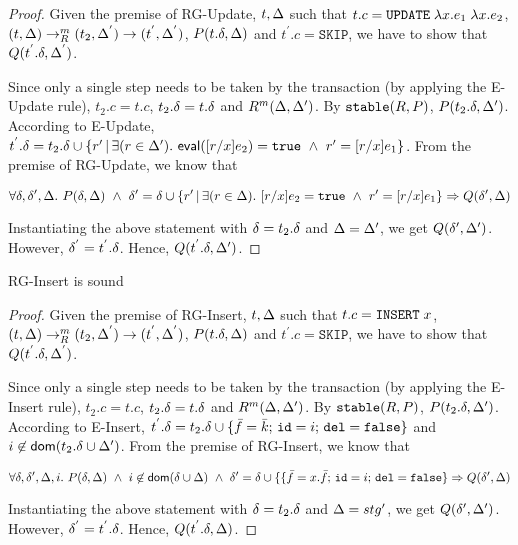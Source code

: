 \documentclass[acmlarge,anonymous]{acmart}\settopmatter{printfolios=true}
\begin{document}
\begin{proof}
Given the premise of RG-Update, $t, \Delta$ such that $t.c = \texttt{UPDATE}\;\lambda x.e_1\;\lambda x.e_2$, $(t, \Delta) \rightarrow_{R}^{m} (t_2, \Delta^{'}) \rightarrow (t^{'}, \Delta^{'})$, $P(t.\delta, \Delta)$ and $t^{'}.c = \texttt{SKIP}$, we have to show that $Q(t^{'}.\delta, \Delta^{'})$. 

Since only a single step needs to be taken by the transaction (by applying the E-Update rule), $t_2.c = t.c$, $t_2.\delta = t.\delta$ and $R^m(\Delta, \Delta')$. By $\mathtt{stable}(R, P)$, $P(t_2.\delta, \Delta')$. According to E-Update,  $t^{'}.\delta = t_2.\delta \cup \{r' \,|\, \exists(r\in \Delta').~ \textsf{eval}([r/x]e_2)={\tt true} ~\wedge~ r'=[r/x]e_1\}$. From the premise of RG-Update, we know that 

$$
\forall\delta,\delta',\Delta.~P(\delta,\Delta) ~\wedge~ 
  \delta' = \delta \cup \{r' \,|\, \exists(r \in \Delta).~ [r/x]e_2 ={\tt true} ~\wedge~ r'=[r/x]e_1\} \Rightarrow 
  Q(\delta',\Delta)
$$

Instantiating the above statement with $\delta = t_2.\delta$ and $\Delta = \Delta'$, we get $Q(\delta',\Delta')$. However, $\delta^{'} = t^{'}.\delta$. Hence, $Q(t^{'}.\delta,\Delta')$.
\end{proof}

\begin{theorem}
RG-Insert is sound
\end{theorem}

\begin{proof}
Given the premise of RG-Insert, $t, \Delta$ such that $t.c = \texttt{INSERT}\;x$, $(t, \Delta) \rightarrow_{R}^{m} (t_2, \Delta^{'}) \rightarrow (t^{'}, \Delta^{'})$, $P(t.\delta, \Delta)$ and $t^{'}.c = \texttt{SKIP}$, we have to show that $Q(t^{'}.\delta, \Delta^{'})$. 

Since only a single step needs to be taken by the transaction (by applying the E-Insert rule), $t_2.c = t.c$, $t_2.\delta = t.\delta$ and $R^m(\Delta, \Delta')$. By $\mathtt{stable}(R, P)$, $P(t_2.\delta, \Delta')$. According to E-Insert, $t^{'}.\delta = t_2.\delta \cup \{\bar{f}=\bar{k};\,\texttt{id}=i;\,\texttt{del}={\tt false}\}$ and $i \not\in \textsf{dom}(t_2.\delta \cup \Delta')$. From the premise of RG-Insert, we know that 

$$
\forall\delta,\delta',\Delta,i.~P(\delta,\Delta) ~\wedge~ i \not\in
  \textsf{dom}(\delta\cup\Delta) 
  ~\wedge~ \delta'=\delta \cup 
  \{\{\bar{f}=x.\bar{f};\,\texttt{id}=i;\,\texttt{del}={\tt false}\} \Rightarrow 
  Q(\delta',\Delta)
$$

Instantiating the above statement with $\delta = t_2.\delta$ and $\Delta = stg'$, we get $Q(\delta',\Delta')$. However, $\delta^{'} = t^{'}.\delta$. Hence, $Q(t^{'}.\delta,\Delta)$.
\end{proof}
\end{document}
